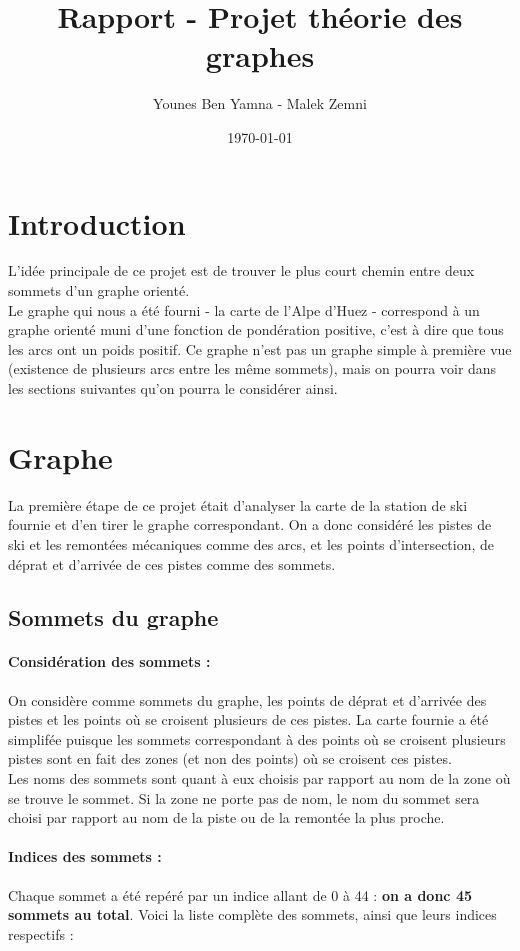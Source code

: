 \documentclass[a4]{article}
\author{Younes Ben Yamna - Malek Zemni}
\title{Rapport - Projet théorie des graphes}
\date{\today}
\begin{document}
\maketitle

	\section{Introduction}
			L'idée principale de ce projet est de trouver le plus court chemin entre deux sommets d'un graphe orienté.\\
			Le graphe qui nous a été fourni - la carte de l'Alpe d'Huez - correspond à un graphe orienté muni d'une fonction de pondération positive, 
			c'est à dire que tous les arcs ont un poids positif. Ce graphe n'est pas un graphe simple à première vue (existence de plusieurs arcs 
			entre les même sommets), mais on pourra voir dans les sections suivantes qu'on pourra le considérer ainsi.
			
	\section{Graphe}
			La première étape de ce projet était d'analyser la carte de la station de ski fournie et d'en tirer le graphe correspondant. 
			On a donc considéré les pistes de ski et les remontées mécaniques comme des arcs, et les points d'intersection, de déprat et 
			d'arrivée de ces pistes comme des sommets.
			
		\subsection{Sommets du graphe}
			\paragraph{Considération des sommets :\\}
			On considère comme sommets du graphe, les points de déprat et d'arrivée des pistes et les points où se croisent plusieurs de ces pistes. 
			La carte fournie a été simplifée puisque les sommets correspondant à des points où se croisent plusieurs pistes sont en fait des zones 
			(et non des points) où se croisent ces pistes.\\
			Les noms des sommets sont quant à eux choisis par rapport au nom de la zone où se trouve le sommet. 
			Si la zone ne porte pas de nom, le nom du sommet sera choisi par rapport au nom de la piste ou de la remontée la plus proche.
			\paragraph{Indices des sommets :\\}
			Chaque sommet a été repéré par un indice allant de 0 à 44 : \textbf{on a donc 45 sommets au total}.
			Voici la liste complète des sommets, ainsi que leurs indices respectifs :
			
			
\end{document}
